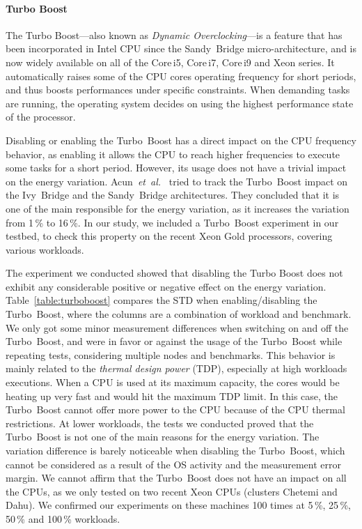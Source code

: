 \paragraph{Turbo Boost}
The Turbo Boost---also known as \emph{Dynamic Overclocking}---is a feature that has been incorporated in Intel CPU since the Sandy~Bridge micro-architecture, and is now widely available on all of the Core\,i5, Core\,i7, Core\,i9 and Xeon series.
It automatically raises some of the CPU cores operating frequency for short periods, and thus boosts performances under specific constraints.
When demanding tasks are running, the operating system decides on using the highest performance state of the processor.

Disabling or enabling the Turbo~Boost has a direct impact on the CPU frequency behavior, as enabling it allows the CPU to reach higher frequencies to execute some tasks for a short period.
However, its usage does not have a trivial impact on the energy variation.
Acun~\emph{et~al.}~\cite{acun_variation_2016} tried to track the Turbo~Boost impact on the Ivy~Bridge and the Sandy~Bridge architectures.
They concluded that it is one of the main responsible for the energy variation, as it increases the variation from 1\,\% to 16\,\%.
In our study, we included a Turbo~Boost experiment in our testbed, to check this property on the recent Xeon Gold processors, covering various workloads.

The experiment we conducted showed that disabling the Turbo Boost does not exhibit any considerable positive or negative effect on the energy variation.
Table~\ref{table:turboboost} compares the STD when enabling/disabling the Turbo~Boost, where the columns are a combination of workload and benchmark.
We only got some minor measurement differences when switching on and off the Turbo~Boost, and were in favor or against the usage of the Turbo~Boost while repeating tests, considering multiple nodes and benchmarks.
This behavior is mainly related to the \emph{thermal design power} (TDP), especially at high workloads executions.
When a CPU is used at its maximum capacity, the cores would be heating up very fast and would hit the maximum TDP limit.
In this case, the Turbo~Boost cannot offer more power to the CPU because of the CPU thermal restrictions.
At lower workloads, the tests we conducted proved that the Turbo~Boost is not one of the main reasons for the energy variation.
The variation difference is barely noticeable when disabling the Turbo~Boost, which cannot be considered as a result of the OS activity and the measurement error margin.
We cannot affirm that the Turbo~Boost does not have an impact on all the CPUs, as we only tested on two recent Xeon CPUs (clusters \textsf{Chetemi} and \textsf{Dahu}).
We confirmed our experiments on these machines 100 times at 5\,\%, 25\,\%, 50\,\% and 100\,\% workloads.

